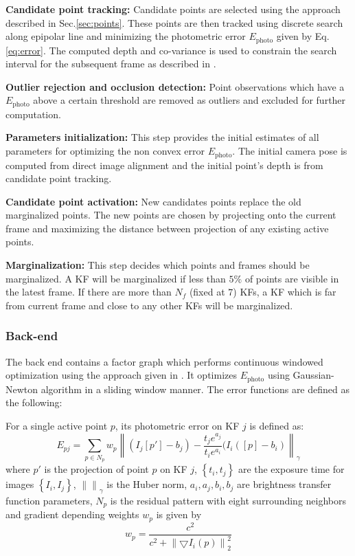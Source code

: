 \documentclass[letterpaper, 10 pt, conference]{ieeeconf}  %
\begin{document}
\textbf{Candidate point tracking:} Candidate points are selected using the approach described in Sec.\ref{sec:points}. These points are then tracked using discrete search along epipolar line and minimizing the photometric error $E_{\text{photo}}$ given by Eq. \ref{eq:error}. The computed depth and co-variance is used to constrain the search interval for the subsequent frame as described in \cite{LSD_SLAM}.

\textbf{Outlier rejection and occlusion detection:} Point observations which have a $E_{\text{photo}}$ above a certain threshold are removed as outliers and excluded for further computation.

\textbf{Parameters initialization:} This step provides the initial estimates of all parameters for optimizing the non convex error $E_{\text{photo}}$. The initial camera pose is computed from direct image alignment and the initial point's depth is from candidate point tracking.

\textbf{Candidate point activation:} New candidates points replace the old marginalized points. The new points are chosen by projecting onto the current frame and maximizing the distance between projection of any existing active points.

\textbf{Marginalization:} This step decides which points and frames should be marginalized. A KF will be marginalized if less than $5\%$ of points are visible in the latest frame. If there are more than $N_{f}$ (fixed at $7$) KFs, a KF which is far from current frame and close to any other KFs will be marginalized.\\


\subsubsection{Back-end}
The back end contains a factor graph which performs continuous windowed optimization using the approach given in \cite{windowed_optimization}. It optimizes $E_{\text{photo}}$ using Gaussian-Newton algorithm in a sliding window manner. The error functions are defined as the following:

For a single active point $p$, its photometric error on KF $j$ is defined as:
\begin{equation}
    E_{pj} = \sum_{p \in N_{p}} w_{p}\left \| (I_{j}[p'] - b_{j}) - \frac{t_{j}e^{a_{j}}}{t_{i}e^{a_{i}}}(I_{i}([p] - b_{i}) \right \|_{\gamma}
\end{equation}
where $p'$ is the projection of point $p$ on KF $j$, $\left\{t_{i}, t_{j}\right\}$ are the exposure time for images $\left\{I_{i}, I_{j}\right\}$, $\left \|  \right \|_\gamma$ is the Huber norm, $a_{i}, a_{j}, b_{i}, b_{j}$ are brightness transfer function parameters, $N_{p}$ is the residual pattern with eight surrounding neighbors and gradient depending weights $w_{p}$ is given by
\begin{equation}
    w_{p} = \frac{c^{2}}{c^{2} + \left \| \bigtriangledown I_{i}(p) \right \|_{2}^{2}}
\end{equation}
\end{document}
